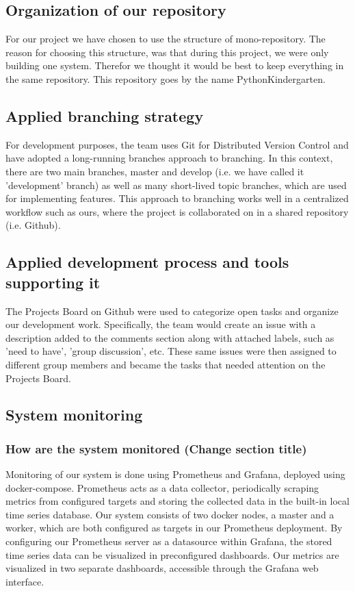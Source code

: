 \subsection{Organization of our repository}
For our project we have chosen to use the structure of mono-repository. The reason for choosing this structure, was that during this project, we were only building one system. Therefor we thought it would be best to keep everything in the same repository. This repository goes by the name PythonKindergarten. \newline

\subsection{Applied branching strategy}
For development purposes, the team uses Git for Distributed Version Control and have adopted a long-running branches approach to branching. In this context, there are two main branches, master and develop (i.e. we have called it 'development' branch) as well as many short-lived topic branches, which are used for implementing features. This approach to branching works well in a centralized workflow such as ours, where the project is collaborated on in a shared repository (i.e. Github).

\subsection{Applied development process and tools supporting it}
The Projects Board on Github were used to categorize open tasks and organize our development work. Specifically, the team would create an issue with a description added to the comments section along with attached labels, such as 'need to have', 'group discussion', etc. These same issues were then assigned to different group members and became the tasks that needed attention on the Projects Board.
  
\subsection{System monitoring}
\subsubsection{How are the system monitored (Change section title)}
Monitoring of our system is done using Prometheus and Grafana, deployed using docker-compose. \newline
Prometheus acts as a data collector, periodically scraping metrics from configured targets and storing the collected data in the built-in local time series database.\newline
Our system consists of two docker nodes, a master and a worker, which are both configured as targets in our Prometheus deployment.\newline
By configuring our Prometheus server as a datasource within Grafana, the stored time series data can be visualized in preconfigured dashboards. Our metrics are visualized in two separate dashboards, accessible through the Grafana web interface.

